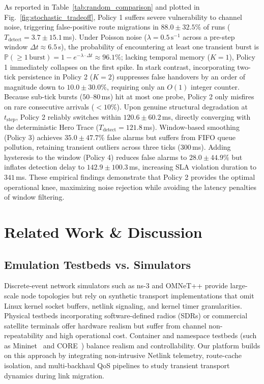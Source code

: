 \documentclass[conference]{IEEEtran}
\begin{document}
As reported in Table~\ref{tab:random_comparison} and plotted in Fig.~\ref{fig:stochastic_tradeoff}, Policy 1 suffers severe vulnerability to channel noise, triggering false-positive route migrations in $88.0 \pm 32.5\%$ of runs ($T_{\text{detect}} = 3.7 \pm 15.1$\,ms). Under Poisson noise ($\lambda = 0.5\,\text{s}^{-1}$ across a pre-step window $\Delta t \approx 6.5$\,s), the probability of encountering at least one transient burst is $\mathbb{P}(\ge 1\,\text{burst}) = 1 - e^{-\lambda \cdot \Delta t} \approx 96.1\%$; lacking temporal memory ($K=1$), Policy 1 immediately collapses on the first spike. In stark contrast, incorporating two-tick persistence in Policy 2 ($K=2$) suppresses false handovers by an order of magnitude down to $10.0 \pm 30.0\%$, requiring only an $O(1)$ integer counter. Because sub-tick bursts ($50\text{--}80$\,ms) hit at most one probe, Policy 2 only misfires on rare consecutive arrivals ($<10\%$). Upon genuine structural degradation at $t_{\text{step}}$, Policy 2 reliably switches within $120.6 \pm 60.2$\,ms, directly converging with the deterministic Hero Trace ($T_{\text{detect}} = 121.8$\,ms). Window-based smoothing (Policy 3) achieves $35.0 \pm 47.7\%$ false alarms but suffers from FIFO queue pollution, retaining transient outliers across three ticks ($300$\,ms). Adding hysteresis to the window (Policy 4) reduces false alarms to $28.0 \pm 44.9\%$ but inflates detection delay to $142.9 \pm 100.3$\,ms, increasing SLA violation duration to $341$\,ms. These empirical findings demonstrate that Policy 2 provides the optimal operational knee, maximizing noise rejection while avoiding the latency penalties of window filtering.

\section{Related Work \& Discussion}

\subsection{Emulation Testbeds vs. Simulators}
Discrete-event network simulators such as ns-3 and OMNeT++ provide large-scale node topologies but rely on synthetic transport implementations that omit Linux kernel socket buffers, netlink signaling, and kernel timer granularities. Physical testbeds incorporating software-defined radios (SDRs) or commercial satellite terminals offer hardware realism but suffer from channel non-repeatability and high operational cost. Container and namespace testbeds (such as Mininet~\cite{lantz2010mininet} and CORE~\cite{ahrenholz2010core}) balance realism and controllability. Our platform builds on this approach by integrating non-intrusive Netlink telemetry, route-cache isolation, and multi-backhaul QoS pipelines to study transient transport dynamics during link migration.
\end{document}
